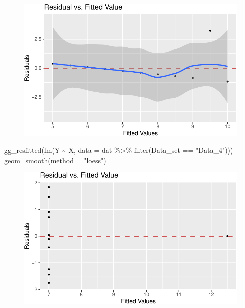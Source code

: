 \documentclass[
  letterpaper,
  DIV=11,
  numbers=noendperiod]{scrreprt}
\newenvironment{Shaded}{\begin{snugshade}}{\end{snugshade}}
\newcommand{\AttributeTok}[1]{\textcolor[rgb]{0.40,0.45,0.13}{#1}}
\newcommand{\FunctionTok}[1]{\textcolor[rgb]{0.28,0.35,0.67}{#1}}
\newcommand{\NormalTok}[1]{\textcolor[rgb]{0.00,0.23,0.31}{#1}}
\newcommand{\SpecialCharTok}[1]{\textcolor[rgb]{0.37,0.37,0.37}{#1}}
\newcommand{\StringTok}[1]{\textcolor[rgb]{0.13,0.47,0.30}{#1}}
\begin{document}
\begin{figure}[H]

{\centering \includegraphics{./08-linearreg_files/figure-pdf/unnamed-chunk-26-2.pdf}

}

\end{figure}

\begin{Shaded}
\begin{Highlighting}[]
\FunctionTok{gg\_resfitted}\NormalTok{(}\FunctionTok{lm}\NormalTok{(Y }\SpecialCharTok{\textasciitilde{}}\NormalTok{ X, }\AttributeTok{data =}\NormalTok{ dat }\SpecialCharTok{\%\textgreater{}\%} 
                  \FunctionTok{filter}\NormalTok{(Data\_set }\SpecialCharTok{==} \StringTok{"Data\_4"}\NormalTok{))) }\SpecialCharTok{+} 
  \FunctionTok{geom\_smooth}\NormalTok{(}\AttributeTok{method =} \StringTok{"loess"}\NormalTok{)}
\end{Highlighting}
\end{Shaded}

\begin{figure}[H]

{\centering \includegraphics{./08-linearreg_files/figure-pdf/unnamed-chunk-26-3.pdf}

}

\end{figure}
\end{document}
